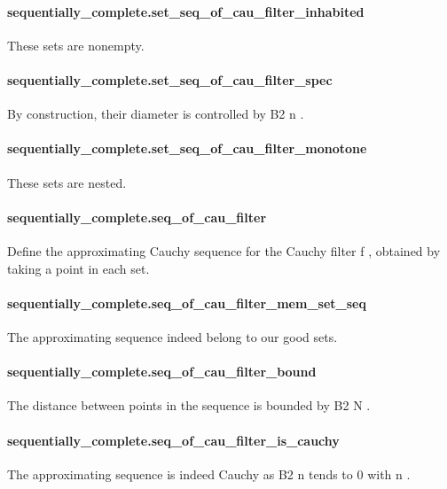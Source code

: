 \documentclass{article}
\begin{document}
\paragraph{sequentially\_complete.set\_seq\_of\_cau\_filter\_inhabited}
\par
These sets are nonempty.
\paragraph{sequentially\_complete.set\_seq\_of\_cau\_filter\_spec}
\par
By construction, their diameter is controlled by 
\colorbox[RGB]{253,246,227}{{{{\color[RGB]{101, 123, 131} B2 n }}}}.
\paragraph{sequentially\_complete.set\_seq\_of\_cau\_filter\_monotone}
\par
These sets are nested.
\paragraph{sequentially\_complete.seq\_of\_cau\_filter}
\par
Define the approximating Cauchy sequence for the Cauchy filter 
\colorbox[RGB]{253,246,227}{{{{\color[RGB]{101, 123, 131} f }}}},
obtained by taking a point in each set.
\paragraph{sequentially\_complete.seq\_of\_cau\_filter\_mem\_set\_seq}
\par
The approximating sequence indeed belong to our good sets.
\paragraph{sequentially\_complete.seq\_of\_cau\_filter\_bound}
\par
The distance between points in the sequence is bounded by 
\colorbox[RGB]{253,246,227}{{{{\color[RGB]{101, 123, 131} B2 N }}}}.
\paragraph{sequentially\_complete.seq\_of\_cau\_filter\_is\_cauchy}
\par
The approximating sequence is indeed Cauchy as 
\colorbox[RGB]{253,246,227}{{{{\color[RGB]{101, 123, 131} B2 n }}}} tends to 
\colorbox[RGB]{253,246,227}{{{{\color[RGB]{108, 113, 196} 0 }}}} with 
\colorbox[RGB]{253,246,227}{{{{\color[RGB]{101, 123, 131} n }}}}.
\end{document}
